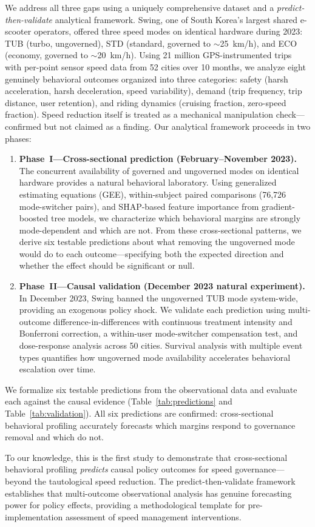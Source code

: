 We address all three gaps using a uniquely comprehensive dataset and a \textit{predict-then-validate} analytical framework. Swing, one of South Korea's largest shared e-scooter operators, offered three speed modes on identical hardware during 2023: TUB (turbo, ungoverned), STD (standard, governed to $\sim$25~km/h), and ECO (economy, governed to $\sim$20~km/h). Using 21 million GPS-instrumented trips with per-point sensor speed data from 52 cities over 10 months, we analyze eight genuinely behavioral outcomes organized into three categories: safety (harsh acceleration, harsh deceleration, speed variability), demand (trip frequency, trip distance, user retention), and riding dynamics (cruising fraction, zero-speed fraction). Speed reduction itself is treated as a mechanical manipulation check---confirmed but not claimed as a finding. Our analytical framework proceeds in two phases:

\begin{enumerate}
    \item \textbf{Phase~I---Cross-sectional prediction (February--November 2023).} The concurrent availability of governed and ungoverned modes on identical hardware provides a natural behavioral laboratory. Using generalized estimating equations (GEE), within-subject paired comparisons (76,726 mode-switcher pairs), and SHAP-based feature importance from gradient-boosted tree models, we characterize which behavioral margins are strongly mode-dependent and which are not. From these cross-sectional patterns, we derive six testable predictions about what removing the ungoverned mode would do to each outcome---specifying both the expected direction and whether the effect should be significant or null.

    \item \textbf{Phase~II---Causal validation (December 2023 natural experiment).} In December 2023, Swing banned the ungoverned TUB mode system-wide, providing an exogenous policy shock. We validate each prediction using multi-outcome difference-in-differences with continuous treatment intensity and Bonferroni correction, a within-user mode-switcher compensation test, and dose-response analysis across 50 cities. Survival analysis with multiple event types quantifies how ungoverned mode availability accelerates behavioral escalation over time.
\end{enumerate}

We formalize six testable predictions from the observational data and evaluate each against the causal evidence (Table~\ref{tab:predictions} and Table~\ref{tab:validation}). All six predictions are confirmed: cross-sectional behavioral profiling accurately forecasts which margins respond to governance removal and which do not.

To our knowledge, this is the first study to demonstrate that cross-sectional behavioral profiling \textit{predicts} causal policy outcomes for speed governance---beyond the tautological speed reduction. The predict-then-validate framework establishes that multi-outcome observational analysis has genuine forecasting power for policy effects, providing a methodological template for pre-implementation assessment of speed management interventions.
